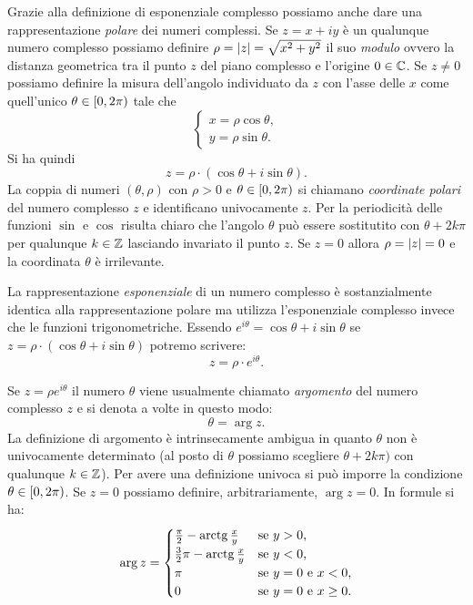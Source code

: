 Grazie alla definizione di esponenziale complesso possiamo anche 
dare una rappresentazione \emph{polare} dei numeri complessi.
Se $z=x+iy$ è un qualunque numero complesso possiamo definire 
$\rho = {\left|z\right|} = \sqrt{x^2+y^2}$ il suo \emph{modulo} 
ovvero la distanza geometrica tra il punto $z$ del piano complesso 
e l'origine $0\in {\mathbb C}$.
Se $z\neq 0$ possiamo definire la misura dell'angolo individuato 
da $z$ con l'asse delle $x$ come quell'unico 
$\theta \in \left[0,2\pi\right)$ tale che
\[
  \begin{cases}
    x = \rho \cos \theta,\\
    y = \rho \sin \theta.
  \end{cases}
\]
Si ha quindi 
\[
  z = \rho \cdot (\cos \theta + i \sin \theta). 
\]
La coppia di numeri $(\theta,\rho)$ con $\rho>0$ e $\theta\in\left[0,2\pi\right)$ 
si chiamano \emph{coordinate polari} del numero complesso $z$ 
e identificano univocamente $z$. 
Per la periodicità delle funzioni $\sin$ e $\cos$ risulta chiaro 
che l'angolo $\theta$ può essere sostitutito con $\theta +2k\pi$ 
per qualunque $k\in {\mathbb Z}$ lasciando invariato il punto $z$.
Se $z=0$ allora $\rho={\left|z\right|}=0$ e la coordinata $\theta$ è irrilevante.

La rappresentazione \emph{esponenziale} di un numero complesso 
è sostanzialmente identica alla rappresentazione polare 
ma utilizza l'esponenziale complesso invece che 
le funzioni trigonometriche. 
Essendo $e^{i\theta} = \cos \theta + i\sin \theta$
se $z=\rho\cdot (\cos \theta + i \sin \theta)$ potremo scrivere:
\[
  z = \rho \cdot e^{i\theta}.  
\]

Se $z=\rho e^{i\theta}$
il numero $\theta$ viene usualmente chiamato \emph{argomento}
del numero complesso $z$ e si denota a volte 
in questo modo:
\[
  \theta = \arg z.  
\]
La definizione di argomento è intrinsecamente ambigua 
in quanto $\theta$ non è univocamente determinato
(al posto di $\theta$ possiamo scegliere $\theta+2k\pi)$ 
con qualunque $k\in {\mathbb Z}$).
Per avere una definizione univoca si può imporre 
la condizione $\theta\in\left[0,2\pi\right)$.
Se $z=0$ possiamo definire, arbitrariamente, 
$\arg z = 0$. 
In formule si ha:
\[
  \arg z =
  \begin{cases}
   \frac \pi 2 - \operatorname{arctg} \frac x y & \text{se $y>0$,} \\
   \frac 3 2 \pi- \operatorname{arctg} \frac x y & \text{se $y<0$,} \\
   \pi & \text{se $y=0$ e $x<0$,} \\
   0 & \text{se $y=0$ e $x\ge 0$.}
   \end{cases}
\]

